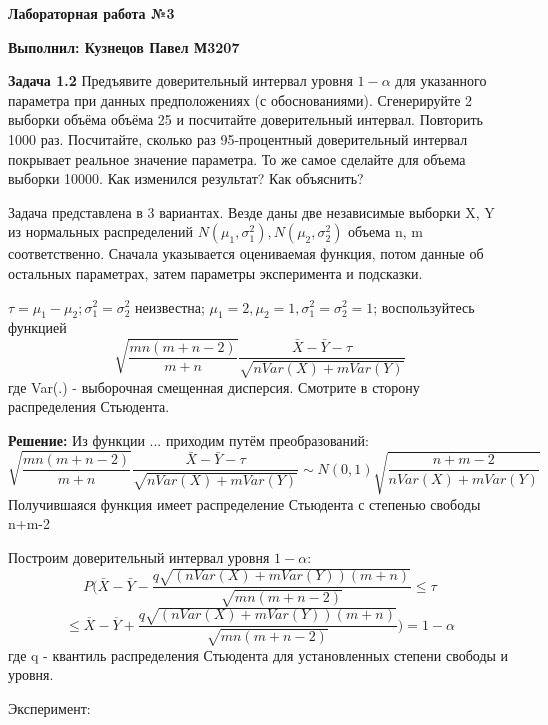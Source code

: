 \documentclass{article}
\begin{document}
\Large\textbf{Лабораторная работа №3}

\textbf{Выполнил: Кузнецов Павел М3207}
\vspace{5mm}

\textbf{Задача 1.2}
Предъявите доверительный интервал уровня $1 - \alpha$ для указанного параметра при данных предположениях (с обоснованиями). Сгенерируйте 2 выборки объёма объёма 25 и посчитайте доверительный интервал. Повторить 1000 раз. Посчитайте, сколько раз 95-процентный доверительный интервал покрывает реальное значение параметра. То же самое сделайте для объема выборки 10000. Как изменился результат? Как объяснить?

Задача представлена в 3 вариантах. Везде даны две независимые выборки X, Y из нормальных распределений $ N(\mu_1, \sigma_1^2), N(\mu_2, \sigma_2^2)$ объема n, m соответственно. Сначала указывается оцениваемая функция, потом данные об остальных параметрах, затем параметры эксперимента и подсказки.

$\tau = \mu_1 - \mu_2; \sigma_1^2=\sigma_2^2$ неизвестна; $\mu_1=2, \mu_2=1, \sigma_1^2=\sigma_2^2=1$; воспользуйтесь функцией $$\sqrt{\frac{mn(m+n-2)}{m+n}}\frac{\bar X - \bar Y - \tau}{\sqrt{nVar(X)+mVar(Y)}}$$
где Var(.) - выборочная смещенная дисперсия. Смотрите в сторону распределения Стьюдента.

\textbf{Решение:}
    Из функции ... приходим путём преобразований:
    $$\sqrt{\frac{mn(m+n-2)}{m+n}}\frac{\bar X - \bar Y - \tau}{\sqrt{nVar(X)+mVar(Y)}}
    \sim N(0,1)\sqrt{\frac{n+m-2}{nVar(X) + mVar(Y)}}$$
    Получившаяся функция имеет распределение Стьюдента с степенью свободы n+m-2

    Построим доверительный интервал уровня $1-\alpha$:
    $$P(\bar{X} - \bar{Y} - \frac{q\sqrt{(nVar(X)+mVar(Y))(m+n)}}{\sqrt{mn(m+n-2)}} \leq \tau $$
    $$\leq \overline{X} - \overline{Y} + \frac{q\sqrt{(nVar(X)+mVar(Y))(m+n)}}{\sqrt{mn(m+n-2)}}) = 1-\alpha$$
    где q - квантиль распределения Стьюдента для установленных степени свободы и уровня.

    Эксперимент:
\end{document}
